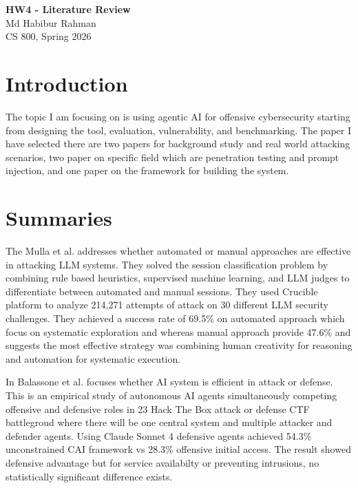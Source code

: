\documentclass[12pt]{article}
\begin{document}
\begin{centering}
{\large\textbf{HW4 - Literature Review}}\\
\vspace{3mm} %
Md Habibur Rahman \\
CS 800, Spring 2026 \\
\end{centering}



\section{Introduction}

The topic I am focusing on is using agentic AI for offensive cybersecurity starting from designing the tool, evaluation, vulnerability, and benchmarking. The paper I have selected there are two papers for background study and real world attacking scenarios, two paper on specific field which are penetration testing and prompt injection, and one paper on the framework for building the system. 
 

\section{Summaries}
The Mulla et al. \cite{mulla2025automation} addresses whether automated or manual approaches are effective in attacking LLM systems. They solved the session classification problem by combining rule based heuristics, supervised machine learning, and LLM judges to differentiate between automated and manual sessions. They used Crucible platform to analyze 214,271 attempts of attack on 30 different LLM security challenges. They achieved a success rate of 69.5\% on automated approach which focus on systematic exploration and whereas manual approach provide 47.6\% and suggests the most effective strategy was combining human creativity for reasoning and automation for systematic execution.

In Balassone et al. \cite{balassone2025cybersecurity} focuses whether AI system is efficient in attack or defense. This is an empirical study of autonomous AI agents simultaneously competing offensive and defensive roles in 23 Hack The Box attack or defense CTF battlegroud where there will be one central system and multiple attacker and defender agents. Using Claude Sonnet 4 defensive agents achieved 54.3\% unconstrained CAI framework vs 28.3\% offensive initial access. The result showed defensive advantage but for service availabilty or preventing intrusions, no statistically significant difference exists. 
\end{document}
